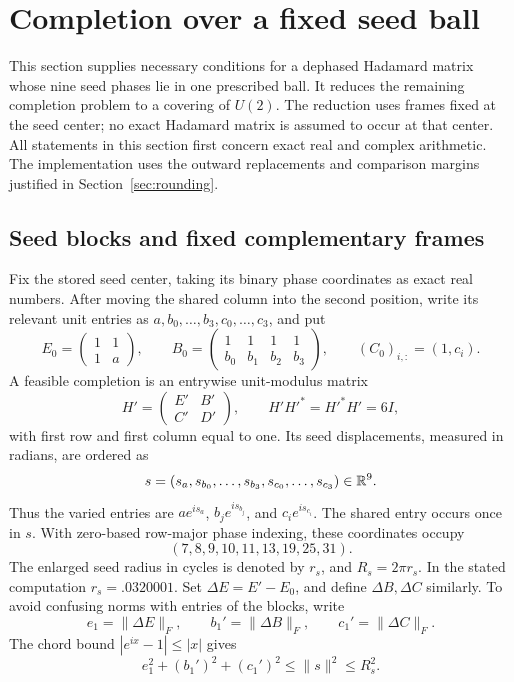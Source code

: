 \section{Completion over a fixed seed ball}
\label{sec:completion}

This section supplies necessary conditions for a dephased Hadamard matrix
whose nine seed phases lie in one prescribed ball.  It reduces the remaining
completion problem to a covering of $U(2)$.  The reduction uses frames fixed
at the seed center; no exact Hadamard matrix is assumed to occur at that
center.  All statements in this section first concern exact real and
complex arithmetic.  The implementation uses the outward replacements and
comparison margins justified in Section~\ref{sec:rounding}.

\subsection{Seed blocks and fixed complementary frames}

Fix the stored seed center, taking its binary phase coordinates as exact
real numbers.  After moving the shared column into the second position,
write its relevant unit entries as $a,b_0,\ldots,b_3,c_0,\ldots,c_3$, and put
\begin{equation}
\label{completion:seed-blocks}
 E_0=\begin{pmatrix}1&1\\1&a\end{pmatrix},\qquad
 B_0=\begin{pmatrix}1&1&1&1\\b_0&b_1&b_2&b_3\end{pmatrix},\qquad
 (C_0)_{i,:}=(1,c_i).
\end{equation}
A feasible completion is an entrywise unit-modulus matrix
\[
 H'=\begin{pmatrix}E'&B'\\ C'&D'\end{pmatrix},\qquad
 H'H'^*=H'^*H'=6I,
\]
with first row and first column equal to one.  Its seed displacements,
measured in radians, are ordered as
\[
 s=(s_a,s_{b_0},\ldots,s_{b_3},s_{c_0},\ldots,s_{c_3})\in\mathbb R^9.
\]
Thus the varied entries are $a e^{i s_a}$, $b_j e^{i s_{b_j}}$, and
$c_i e^{i s_{c_i}}$.  The shared entry occurs once in $s$.  With zero-based
row-major phase indexing, these coordinates occupy
\begin{equation}
\label{completion:position-map}
 (7,8,9,10,11,13,19,25,31).
\end{equation}
The enlarged seed radius in cycles is denoted by $r_s$, and
$R_s=2\pi r_s$.  In the stated computation $r_s=.0320001$.
Set $\Delta E=E'-E_0$, and define $\Delta B,\Delta C$ similarly.  To avoid
confusing norms with entries of the blocks, write
\[
 e_1=\lVert\Delta E\rVert_F,\qquad
 b_1'=\lVert\Delta B\rVert_F,\qquad
 c_1'=\lVert\Delta C\rVert_F.
\]
The chord bound $|e^{ix}-1|\le |x|$ gives
\begin{equation}
\label{completion:seed-norm}
 e_1^2+(b_1')^2+(c_1')^2\le\lVert s\rVert^2\le R_s^2.
\end{equation}

